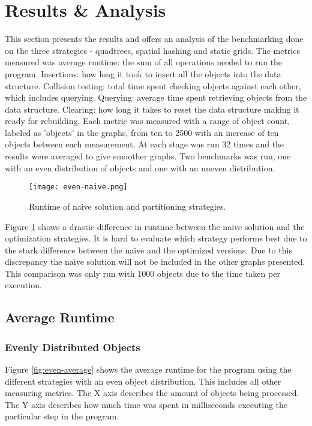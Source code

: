 \documentclass[a4paper, 12pt]{article}
\begin{document}
\section{Results \& Analysis}
This section presents the results and offers an analysis of the benchmarking
done on the three strategies - quadtrees, spatial hashing and static grids. The
metrics measured was average runtime: the sum of all operations needed to run
the program. Insertions: how long it took to insert all the objects into the
data structure. Collision testing: total time spent checking objects against
each other, which includes querying. Querying: average time spent retrieving
objects from the data structure. Clearing: how long it takes to reset the data
structure making it ready for rebuilding. Each metric was measured with a range
of object count, labeled as 'objects' in the graphs, from ten to 2500 with an
increase of ten objects between each measurement. At each stage was run 32 times
and the results were averaged to give smoother graphs. Two benchmarks was run,
one with an even distribution of objects and one with an uneven distribution.

\begin{figure}[H]
    \centering
    \texttt{[image: even-naive.png]}
    \caption{Runtime of naive solution and partitioning strategies.}
    \label{fig:naive}
\end{figure}

Figure \ref{fig:naive} shows a drastic difference in runtime between the naive
solution and the optimization strategies. It is hard to evaluate which strategy
performs best due to the stark difference between the naive and the optimized
versions. Due to this discrepancy the naive solution will not be included in the
other graphs presented. This comparison was only run with 1000 objects due to
the time taken per execution.

\subsection{Average Runtime}

\subsubsection{Evenly Distributed Objects}
Figure \ref{fig:even-average} shows the average runtime for the program
using the different strategies with an even object distribution. This includes
all other measuring metrics. The X axis describes the amount of objects being
processed. The Y axis describes how much time was spent in milliseconds
executing the particular step in the program.
\end{document}
